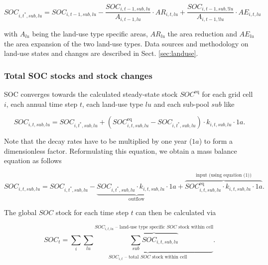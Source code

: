 \documentclass[gc, manuscript]{copernicus}
\begin{document}
\begin{equation}
SOC_{i,t^*,sub,lu} = SOC_{i,t-1,sub,lu} - \frac{SOC_{i,t-1,sub,lu}}{A_{i,t-1,lu}} \cdot  AR_{i,t,lu} + \frac{SOC_{i,t-1,sub,!lu}}{A_{i,t-1,!lu}} \cdot  AE_{i,t,lu}
\label{eq:ctransfer}
\end{equation}

with \(A_{lu}\) being the land-use type specific areas, \(AR_{lu}\) the area reduction and \(AE_{lu}\) the area expansion of the two land-use types. Data sources and methodology on land-use states and changes are described in Sect. \ref{sec:landuse}.

\hypertarget{sec:totalsoc}{%
\subsubsection{Total SOC stocks and stock changes}\label{sec:totalsoc}}

SOC converges towards the calculated steady-state stock \(SOC^{\mathrm{eq}}\) for each grid cell \(i\), each annual time step \(t\), each land-use type \(lu\) and each sub-pool \(sub\) like

\begin{equation}
SOC_{i,t,sub,lu} = SOC_{i,t^*,sub,lu} + (SOC^{\mathrm{eq}}_{i,t,sub,lu} - SOC_{i,t^*,sub,lu}) \cdot k_{i,t,sub,lu} \cdot 1\unit{a}.
\label{eq:SOCstate}
\end{equation}

Note that the decay rates have to be multiplied by one year (\(1a\)) to form a dimensionless factor.
Reformulating this equation, we obtain a mass balance equation as follows

\begin{equation}
SOC_{i,t,sub,lu} = SOC_{i,t^*,sub,lu} - \underbrace{SOC_{i,t^*,sub,lu} \cdot k_{i,t,sub,lu} \cdot 1\unit{a}}_{\text{outflow}} + \overbrace{SOC^{\mathrm{eq}}_{i,t,sub,lu} \cdot k_{i,t,sub,lu} \cdot 1\unit{a}}^{\text{input (using equation (1))}}.
\label{eq:steadystate2budget}
\end{equation}

The global \(SOC\) stock for each time step \(t\) can then be calculated via

\begin{equation}
SOC_{t} = \sum_{i} \underbrace{\sum_{lu} \overbrace{\sum_{sub} SOC_{i,t,sub,lu}}^{\text{$SOC_{i,t,lu}$ -- land-use type specific $SOC$ stock within cell}}}_{\text{$SOC_{i,t}$ -- total $SOC$ stock within cell}}.
\label{eq:totalstock}
\end{equation}
\end{document}
